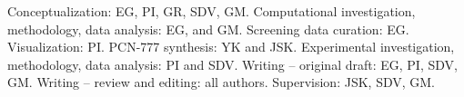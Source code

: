

Conceptualization: EG, PI, GR, SDV, GM. Computational investigation,
methodology, data analysis: EG, and GM. Screening data curation: EG.
Visualization: PI. PCN-777 synthesis: YK and JSK. Experimental investigation,
methodology, data analysis: PI and SDV. Writing -- original draft: EG, PI, SDV,
GM. Writing -- review and editing: all authors. Supervision: JSK, SDV, GM.
